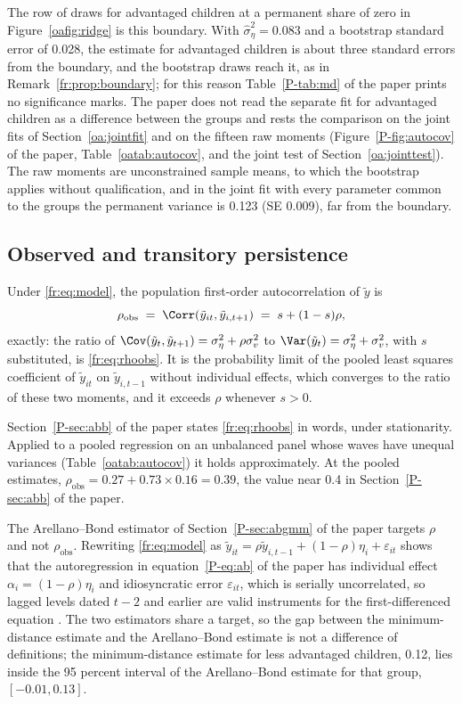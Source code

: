 The row of draws for advantaged children at a permanent share of zero in
Figure~\ref{oafig:ridge} is this boundary. With
$\hat\sigma^2_\eta = 0.083$ and a bootstrap standard error of 0.028, the
estimate for advantaged children is about three standard errors from the
boundary, and the bootstrap draws reach it, as in Remark~\ref{fr:prop:boundary}; for this reason Table~\ref{P-tab:md} of the paper prints no significance marks. The paper does not read the separate fit for advantaged children as a difference between the groups and rests the comparison on the joint fits of Section~\ref{oa:jointfit} and on the fifteen raw moments (Figure~\ref{P-fig:autocov} of the paper, Table~\ref{oatab:autocov}, and the
joint test of Section~\ref{oa:jointtest}). The raw moments are unconstrained sample means, to which the bootstrap applies without qualification, and in the joint fit with every parameter common to the groups the permanent variance is 0.123 (SE 0.009), far from the boundary.

\subsection{Observed and transitory persistence}

Under \eqref{fr:eq:model}, the population first-order autocorrelation of
$\tilde y$ is
\begin{equation}
\rho_{\mathrm{obs}} \;=\; \Corr(\tilde y_{it}, \tilde y_{i,t+1}) \;=\; s + (1-s)\rho,
\label{fr:eq:rhoobs}
\end{equation}
exactly: the ratio of $\Cov(\tilde y_t, \tilde y_{t+1}) = \sigma^2_\eta + \rho\sigma^2_v$ to
$\Var(\tilde y_t) = \sigma^2_\eta + \sigma^2_v$, with $s$ substituted, is \eqref{fr:eq:rhoobs}.
It is the probability limit of the pooled least squares coefficient of
$\tilde y_{it}$ on $\tilde y_{i,t-1}$ without individual effects, which converges
to the ratio of these two moments, and it exceeds $\rho$ whenever $s > 0$.

Section~\ref{P-sec:abb} of the paper states \eqref{fr:eq:rhoobs} in words, under stationarity. Applied to a pooled regression on an unbalanced panel whose waves have unequal variances (Table~\ref{oatab:autocov}) it holds approximately. At the
pooled estimates, $\rho_{\mathrm{obs}} = 0.27 + 0.73 \times 0.16 = 0.39$,
the value near 0.4 in Section~\ref{P-sec:abb} of the paper.

The Arellano--Bond estimator of Section~\ref{P-sec:abgmm} of the paper
targets $\rho$ and not $\rho_{\mathrm{obs}}$. Rewriting
\eqref{fr:eq:model} as
$\tilde y_{it} = \rho\tilde y_{i,t-1} + (1-\rho)\eta_i + \varepsilon_{it}$
shows that the autoregression in equation~\eqref{P-eq:ab} of the paper
has individual effect $\alpha_i = (1-\rho)\eta_i$ and idiosyncratic error
$\varepsilon_{it}$, which is serially uncorrelated, so lagged levels dated
$t-2$ and earlier are valid instruments for the first-differenced
equation \citep{ArellanoBond1991}. The two estimators share a target, so the gap between the minimum-distance estimate and the
Arellano--Bond estimate is not a difference of definitions; the minimum-distance estimate for less advantaged children, 0.12, lies inside the 95 percent interval of the Arellano--Bond estimate for that group, $[-0.01, 0.13]$.

